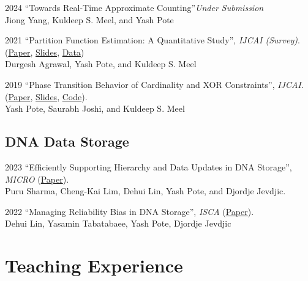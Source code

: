 \documentclass[12pt,letterpaper]{report}
\begin{document}
\begin{tablist}
		\item[2024] \tab  	\enquote{Towards Real-Time Approximate Counting}\textit{Under Submission} \\
	Jiong Yang, Kuldeep S. Meel,  and Yash Pote
	
	\item[2021] \tab  \enquote{Partition Function Estimation: A Quantitative Study},  \textit{IJCAI (Survey)}.\\
(\href{https://arxiv.org/abs/2105.11132}{Paper}, \href{https://meelgroup.github.io/publication/ijcai21_partition}{Slides}, \href{https://doi.org/10.5281/zenodo.4769117}{Data})\\
Durgesh Agrawal, Yash Pote, and Kuldeep S. Meel

		\item[2019] \tab \enquote{Phase Transition Behavior of Cardinality and
	XOR Constraints}, \textit{IJCAI}.\\ (\href{https://arxiv.org/abs/1910.09755}{Paper},  \href{https://meelgroup.github.io/files/slides/ijcai19pjm.pdf}{Slides},  \href{https://github.com/meelgroup/1-CARD-XOR/}{Code}).\\
Yash Pote, Saurabh Joshi, and Kuldeep S. Meel

\end{tablist}
	\subsection*{DNA Data Storage}
	\begin{tablist}
	
		\item[2023] \tab  \enquote{Efficiently Supporting Hierarchy and Data Updates in DNA Storage}, \textit{MICRO} (\href{https://arxiv.org/abs/2212.13447}{Paper}).\\
	Puru Sharma, Cheng-Kai Lim, Dehui Lin, Yash Pote, and Djordje Jevdjic.
	
		\item[2022] \tab  \enquote{Managing Reliability Bias in DNA Storage}, \textit{ISCA}  (\href{https://arxiv.org/abs/2204.12261}{Paper}).\\
	Dehui Lin, Yasamin Tabatabaee, Yash Pote, Djordje Jevdjic
	
\end{tablist}
	
	\section*{Teaching Experience}
	
\end{document}
